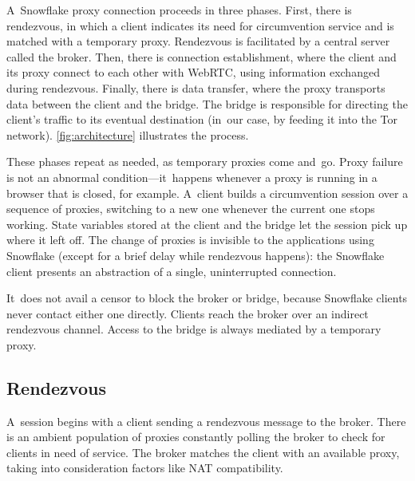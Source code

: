 \documentclass[letterpaper,twocolumn]{article}
\begin{document}
A~Snowflake proxy connection proceeds in three phases.
First, there is rendezvous, in which a client
indicates its need for circumvention service
and is matched with a temporary proxy.
Rendezvous is facilitated by a central server called the broker.
Then, there is connection establishment,
where the client and its proxy connect to each other
with WebRTC, using information exchanged during rendezvous.
Finally, there is data transfer,
where the proxy transports data
between the client and the bridge.
The bridge is responsible for directing the client's traffic
to its eventual destination
(in~our case, by feeding it into the Tor network).
\autoref{fig:architecture} illustrates the process.

These phases repeat as needed, as temporary proxies come and~go.
Proxy failure is not an abnormal condition---it~happens whenever
a proxy is running in a browser that is closed, for example.
A~client builds a circumvention session over
a sequence of proxies, switching to a new one
whenever the current one stops working.
State variables stored at the client and the bridge
let the session pick up where it left off.
The change of proxies is invisible to the applications using Snowflake
(except for a brief delay while rendezvous happens):
the Snowflake client presents an abstraction of a single, uninterrupted connection.

It~does not avail a censor to block the broker or bridge,
because Snowflake clients never contact either one directly.
Clients reach the broker over an indirect rendezvous channel.
Access to the bridge is always mediated by a temporary proxy.

\subsection{Rendezvous}
\label{sec:rendezvous}

A~session begins with a client sending a rendezvous message to the broker.
There is an ambient population of proxies
constantly polling the broker to check for clients in need of service.
The broker matches the client with an available proxy,
taking into consideration factors like NAT compatibility.
\end{document}
